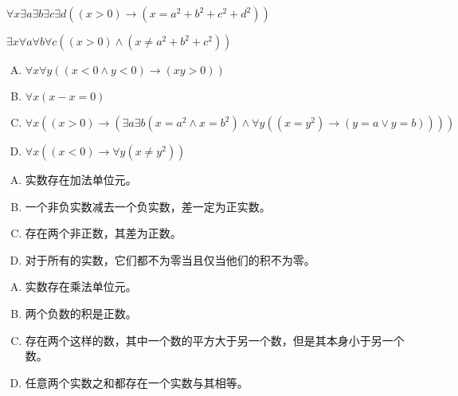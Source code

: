 {{        %
        \begin{practices}
             $\forall x \exists a \exists b \exists c \exists d ((x > 0) \rightarrow (x = a^2 + b^2 + c^2 + d^2))$
        \end{practices}

        \begin{practices}
             $\exists x \forall a \forall b \forall c ((x > 0) \wedge (x \neq a^2 + b^2 + c^2))$
        \end{practices}
        

        \begin{practices}
            \begin{enumerate}[A.]
                \item $\forall x \forall y ((x < 0 \wedge y < 0) \rightarrow (xy > 0))$
                \item $\forall x (x - x = 0)$
                \item $\forall x ((x > 0) \rightarrow (\exists a \exists b (x = a^2 \wedge x = b^2) \wedge \forall y ((x = y^2) \rightarrow (y = a \vee y = b))))$
                \item $\forall x ((x < 0) \rightarrow \forall y (x \neq y^2))$
            \end{enumerate}
        \end{practices}

        \begin{practices}
            \begin{enumerate}[A.]
                \item 实数存在加法单位元。
                \item 一个非负实数减去一个负实数，差一定为正实数。
                \item 存在两个非正数，其差为正数。
                \item 对于所有的实数，它们都不为零当且仅当他们的积不为零。
            \end{enumerate}
        \end{practices}

        \begin{practices}
            \begin{enumerate}[A.]
                \item 实数存在乘法单位元。
                \item 两个负数的积是正数。
                \item 存在两个这样的数，其中一个数的平方大于另一个数，但是其本身小于另一个数。
                \item 任意两个实数之和都存在一个实数与其相等。
            \end{enumerate}
        \end{practices}

}}
